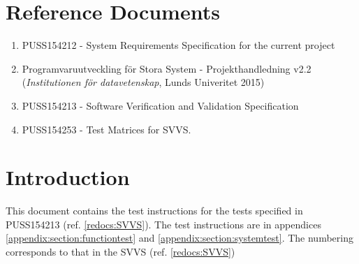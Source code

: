 \documentclass[a4paper]{article}
\begin{document}
\setcounter{tocdepth}{2}
\tableofcontents
\newpage
{}


\section{Reference Documents}
\begin{enumerate}
\item PUSS154212 - System Requirements Specification for the current project \label{refdocs:srs}
\item Programvaruutveckling för Stora System - Projekthandledning v2.2 (\textit{Institutionen för datavetenskap}, Lunds Univeritet 2015) \label{refdocs:projekthandledning}
\item PUSS154213 - Software Verification and Validation Specification \label{redocs:SVVS}
\item PUSS154253 - Test Matrices for SVVS. \label{refdocs:matrices}
\end{enumerate}

\section{Introduction}
This document contains the test instructions for the tests specified in PUSS154213 (ref. \ref{redocs:SVVS}). The test instructions are in appendices \ref{appendix:section:functiontest} and \ref{appendix:section:systemtest}. The numbering corresponds to that in the SVVS (ref. \ref{redocs:SVVS})
\end{document}

